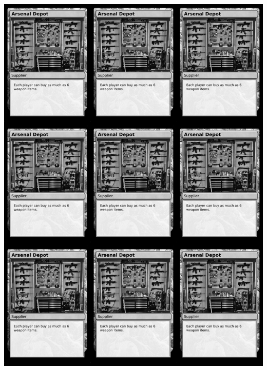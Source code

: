 \documentclass[a4paper]{article}
\begin{document}
\begin{center}
	\centering
	\includegraphics[width=190.5mm,height=266.7mm]{output/temp/page22.png}
\end{center}

\newpage
\end{document}

